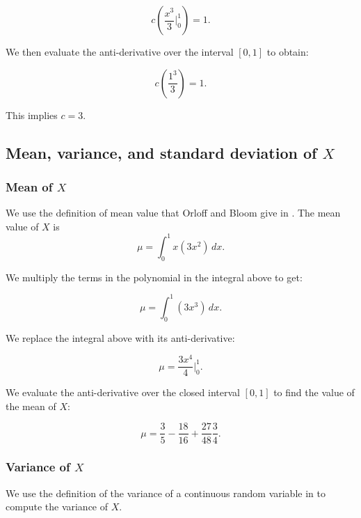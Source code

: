 \documentclass[a4paper,11pt]{article}
\begin{document}
\begin{equation}
  c \left(\frac{x^3}{3} \bigg\rvert_0^1 \right)=1.
\end{equation}

We then evaluate the anti-derivative over the interval $\left[0, 1\right]$ to
obtain:

\begin{equation}
  c \left(\frac{1^3}{3} \right)=1.
\end{equation}

This implies $c=3$.

\subsection{Mean, variance, and standard deviation of $X$}
\subsubsection{Mean of $X$}
We use the definition of mean value that Orloff and Bloom give in
\cite{reading6a}.
The mean value of $X$ is
\begin{equation}
\mu = \int_0^1 x\left( 3x^2 \right)\,dx.
\end{equation}

We multiply the terms in the polynomial in the integral above to get:

\begin{equation}
\mu = \int_0^1 \left( 3x^3 \right)\,dx.
\end{equation}

We replace the integral above with its anti-derivative:

\begin{equation}
\mu = \frac{3x^4}{4} \bigg\rvert_0^1.
\end{equation}

We evaluate the anti-derivative over the closed interval $\left[0, 1 \right]$ to
find the value of the mean of $X$:

\begin{equation}
\mu = \frac{3}{5}-\frac{18}{16}+\frac{27}{48}\frac{3}{4}.
\end{equation}

\subsubsection{Variance of $X$}
We use the definition of the variance of a continuous random variable in
\cite{reading6a} to compute the variance of $X$.
\end{document}
